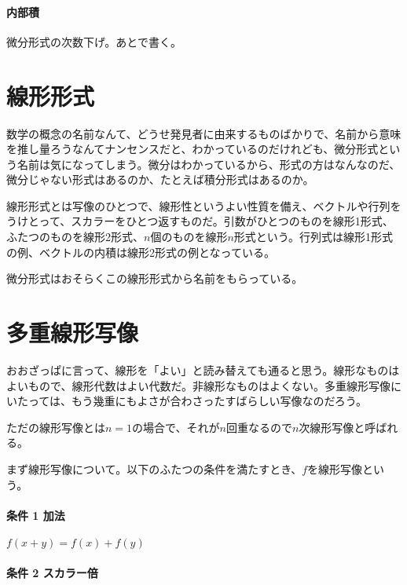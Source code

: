 \paragraph{内部積}

微分形式の次数下げ。あとで書く。


\section{線形形式}

数学の概念の名前なんて、どうせ発見者に由来するものばかりで、名前から意味を推し量ろうなんてナンセンスだと、わかっているのだけれども、微分形式という名前は気になってしまう。微分はわかっているから、形式の方はなんなのだ、微分じゃない形式はあるのか、たとえば積分形式はあるのか。

線形形式とは写像のひとつで、線形性というよい性質を備え、ベクトルや行列をうけとって、スカラーをひとつ返すものだ。引数がひとつのものを線形1形式、ふたつのものを線形2形式、$n$個のものを線形$n$形式という。行列式は線形1形式の例、ベクトルの内積は線形2形式の例となっている。

微分形式はおそらくこの線形形式から名前をもらっている。

\newpage


\section{多重線形写像}

おおざっぱに言って、線形を「よい」と読み替えても通ると思う。線形なものはよいもので、線形代数はよい代数だ。非線形なものはよくない。多重線形写像にいたっては、もう幾重にもよさが合わさったすばらしい写像なのだろう。

ただの線形写像とは$n=1$の場合で、それが$n$回重なるので$n$次線形写像と呼ばれる。

\hrulefill

まず線形写像について。以下のふたつの条件を満たすとき、$ f $を線形写像という。

\paragraph{条件 1 加法}

$ f(x + y) = f(x) + f(y) $

\paragraph{条件 2 スカラー倍}

